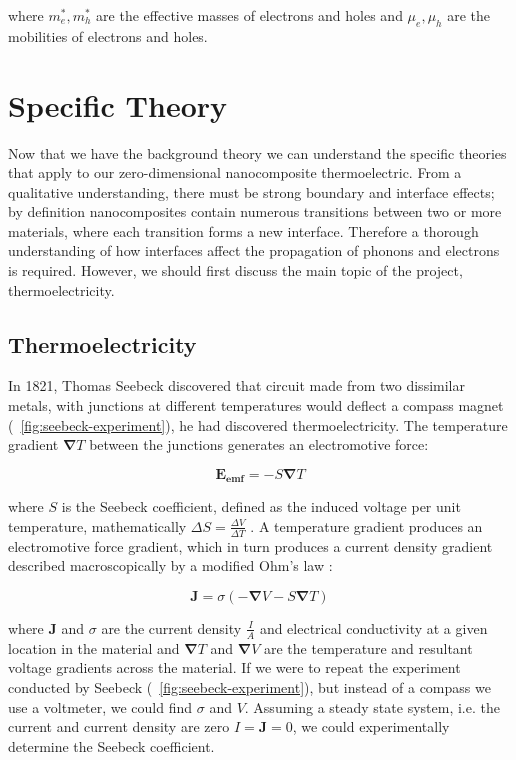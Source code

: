 \documentclass[12pt]{article}
\newcommand{\figref}[2][\figurename~]{#1\ref{#2}}
\renewcommand{\vec}[1]{\mathbf{#1}}
\begin{document}
where $m_e^*, m_h^*$ are the effective masses of electrons and holes and $\mu_e, \mu_h$ are the mobilities of electrons and holes.

\section{Specific Theory}
Now that we have the background theory we can understand the specific theories that apply to our zero-dimensional nanocomposite thermoelectric.
From a qualitative understanding, there must be strong boundary and interface effects; by definition nanocomposites contain numerous transitions between two or more materials, where each transition forms a new interface. Therefore a thorough understanding of how interfaces affect the propagation of phonons and electrons is required. However, we should first discuss the main topic of the project, thermoelectricity.

\subsection{Thermoelectricity}
In 1821, Thomas Seebeck discovered that circuit made from two dissimilar metals, with junctions at different temperatures would deflect a compass magnet (\figref{fig:seebeck-experiment}), he had discovered thermoelectricity. The temperature gradient $\vec{\nabla} T$ between the junctions generates an electromotive force:

\begin{equation}
\label{seebeck-emf}
	\vec{E_{emf}} = -S \vec{\nabla} T
\end{equation}

where $S$ is the Seebeck coefficient, defined as the induced voltage per unit temperature, mathematically $\Delta S = \frac{\Delta V}{\Delta T}$ \cite{modern-thermoelectrics}. A temperature gradient produces an electromotive force gradient, which in turn produces a current density gradient described macroscopically by a modified Ohm's law \cite{kittel}:

\begin{equation}
\label{current-density}
	\vec{J} = \sigma (-\vec{\nabla} V - S \vec{\nabla} T)
\end{equation}

where $\vec{J}$ and $\sigma$ are the current density $\frac{I}{A}$ and electrical conductivity at a given location in the material and $\vec{\nabla} T$ and $\vec{\nabla} V$ are the temperature and resultant voltage gradients across the material. If we were to repeat the experiment conducted by Seebeck (\figref{fig:seebeck-experiment}), but instead of a compass we use a voltmeter, we could find $\sigma$ and $V$. Assuming a steady state system, i.e. the current and current density are zero $I = \vec{J} = 0$, we could experimentally determine the Seebeck coefficient.
\end{document}
